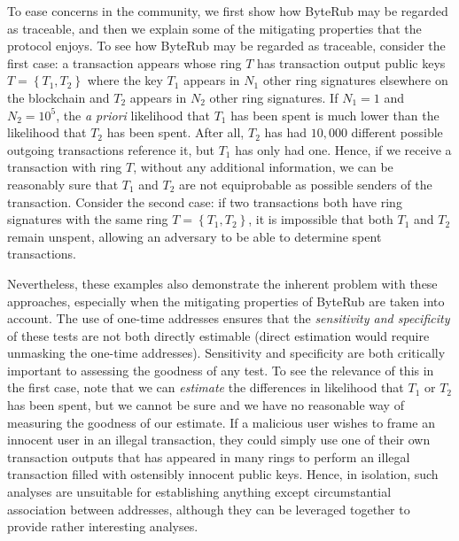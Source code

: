 \documentclass[12pt,english]{mrl}
\theoremstyle{definition}
\numberwithin{equation}{section}
\numberwithin{figure}{section}
\numberwithin{equation}{section}
\numberwithin{equation}{section}
\numberwithin{figure}{section}
\begin{document}
To ease concerns in the community, we first show how ByteRub may be regarded as traceable, and then we explain some of the mitigating properties that the protocol enjoys. To see how ByteRub may be regarded as traceable, consider the first case: a transaction appears whose ring $T$ has transaction output public keys $T = \left\{T_1, T_2\right\}$ where the key $T_1$ appears in $N_1$ other ring signatures elsewhere on the blockchain and $T_2$ appears in $N_2$ other ring signatures. If $N_1 = 1$ and $N_2 = 10^5$, the \textit{a priori} likelihood that $T_1$ has been spent is much lower than the likelihood that $T_2$ has been spent. After all, $T_2$ has had $10,000$ different possible outgoing transactions reference it, but $T_1$ has only had one. Hence, if we receive a transaction with ring $T$, without any additional information, we can be reasonably sure that $T_1$ and $T_2$ are not equiprobable as possible senders of the transaction. Consider the second case: if two transactions both have ring signatures with the same ring $T  = \left\{T_1, T_2\right\}$, it is impossible that both $T_1$ and $T_2$ remain unspent, allowing an adversary to be able to determine spent transactions.

Nevertheless, these examples also demonstrate the inherent problem with these approaches, especially when the mitigating properties of ByteRub are taken into account. The use of one-time addresses ensures that the \textit{sensitivity and specificity} of these tests are not both directly estimable (direct estimation would require unmasking the one-time addresses). Sensitivity and specificity are both critically important to assessing the goodness of any test.  To see the relevance of this in the first case, note that we can \textit{estimate} the differences in likelihood that $T_1$ or $T_2$ has been spent, but we cannot be sure and we have no reasonable way of measuring the goodness of our estimate. If a malicious user wishes to frame an innocent user in an illegal transaction, they could simply use one of their own transaction outputs that has appeared in many rings to perform an illegal transaction filled with ostensibly innocent public keys. Hence, in isolation, such analyses are unsuitable for establishing anything except circumstantial association between addresses, although they can be leveraged together to provide rather interesting analyses. 
\end{document}
